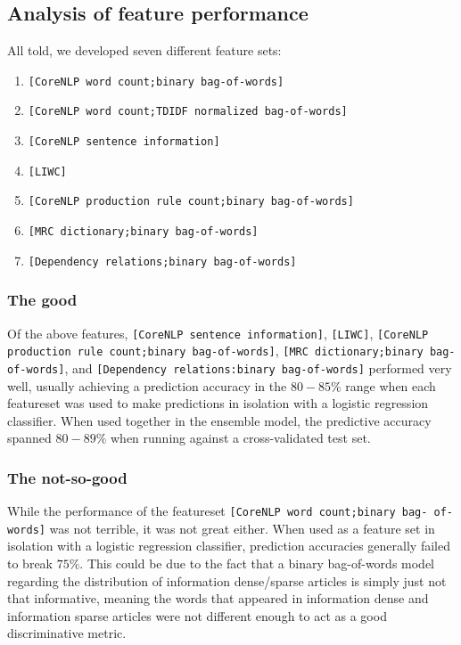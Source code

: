 \documentclass[
10pt, %
a4paper, %
oneside, %
headinclude,footinclude, %
BCOR5mm, %
]{scrartcl}
\begin{document}
\subsection{Analysis of feature performance}
All told, we developed seven different feature sets: 
\begin{enumerate}
	\item \texttt{[CoreNLP word count;binary bag-of-words]} 
	\item \texttt{[CoreNLP word count;TDIDF normalized bag-of-words]} 
	\item \texttt{[CoreNLP sentence information]} 
	\item \texttt{[LIWC]}
	\item \texttt{[CoreNLP production rule count;binary bag-of-words]}
	\item \texttt{[MRC dictionary;binary bag-of-words]}
	\item \texttt{[Dependency relations;binary bag-of-words]}
\end{enumerate}

\subsubsection{The good}
Of the above features, \texttt{[CoreNLP sentence information]},
\texttt{[LIWC]}, \texttt{[CoreNLP production rule count;binary bag-of-words]}, 
\texttt{[MRC dictionary;binary bag-of-words]}, 
and \texttt{[Dependency relations:binary bag-of-words]} performed very well,
usually achieving a prediction accuracy in the $80-85\%$ range when each
featureset was used to make predictions in isolation with a logistic regression
classifier. When used together in the ensemble model, the predictive accuracy
spanned $80-89\%$ when running against a cross-validated test set.

\subsubsection{The not-so-good}
While the performance of the featureset \texttt{[CoreNLP word count;binary bag-
of-words]} was not terrible, it was not great either. When used as a feature set
in isolation with a logistic regression classifier, prediction accuracies
generally failed to break $75\%$. This could be due to the fact that a binary
bag-of-words model regarding the distribution of information dense/sparse
articles is simply just not that informative, meaning the words that appeared in
information dense and information sparse articles were not different enough to
act as a good discriminative metric.
\end{document}

